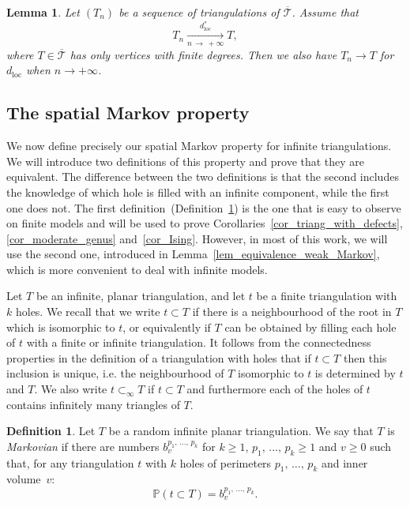 \documentclass[10pt]{amsart}
\newtheorem{lemm}[theo]{Lemma}\newtheorem{prop}[theo]{Proposition}\newtheorem{coro}[theo]{Corollary}\newtheorem{conj}[theo]{Conjecture}
\theoremstyle{definition}\newtheorem{defi}[theo]{Definition}\newtheorem{rema}[theo]{Remark}\newtheorem{exam}[theo]{Example}\newtheorem{exem}[theo]{Example}\newtheorem{nota}[theo]{Notation}
\newcommand{\loc}{\mathrm{loc}}
\newcommand{\T}{\mathcal{T}}
\renewcommand{\P}{\mathbb{P}}
\begin{document}
\begin{lemm}\label{lem_dual_convergence}
Let $(T_n)$ be a sequence of triangulations of $\overline{\T}$. Assume that
\[
T_n \xrightarrow[n\,\to\,+\infty]{d_{\loc}^*} T,
\]
where $T \in \overline{\T}$ has only vertices with finite degrees. Then we also have $T_n \to T$ for $d_{\loc}$ when $n \to +\infty$.
\end{lemm}


\subsection{The spatial Markov property}

We now define precisely our spatial Markov property for infinite triangulations. We will introduce two definitions of this property and prove that they are equivalent. The difference between the two definitions is that the second includes the knowledge of which hole is filled with an infinite component, while the first one does not. The first definition~(Definition~\ref{defn_markov}) is the one that is easy to observe on finite models and will be used to prove Corollaries~\ref{cor_triang_with_defects}, \ref{cor_moderate_genus} and~\ref{cor_Ising}. However, in most of this work, we will use the second one, introduced in Lemma~\ref{lem_equivalence_weak_Markov}, which is more convenient to deal with infinite models.

Let $T$ be an infinite, planar triangulation, and let $t$ be a finite triangulation with $k$ holes. We recall that we write $t \subset T$ if there is a neighbourhood of the root in $T$ which is isomorphic to $t$, or equivalently if $T$ can be obtained by filling each hole of $t$ with a finite or infinite triangulation. It follows from the connectedness properties in the definition of a triangulation with holes that if $t \subset T$ then this inclusion is unique, i.e. the neighbourhood of $T$ isomorphic to $t$ is determined by $t$ and $T$. We also write $t \subset_{\infty} T$ if $t \subset T$ and furthermore each of the holes of $t$ contains infinitely many triangles of $T$.

\begin{defi}\label{defn_markov}
Let $T$ be a random infinite planar triangulation. We say that $T$ is \emph{Markovian} if there are numbers $b^{p_1,\,\dots,\, p_k}_v$ for $k \geq 1$, $p_1,\,\dots,\,p_k \geq 1$ and $v \geq 0$ such that, for any triangulation $t$ with $k$ holes of perimeters $p_1,\,\dots,\,p_k$ and inner volume~$v$:
\[
\P \left(t \subset T \right) = b^{p_1,\,\dots,\,p_k}_v.
\]
\end{defi}
\end{document}
